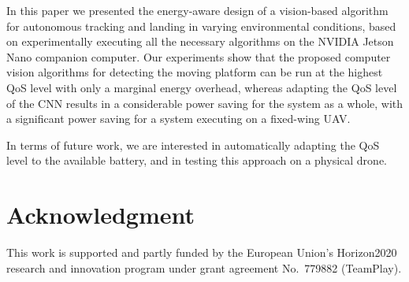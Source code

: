 \documentclass[conference]{IEEEtran}
\begin{document}
In this paper we presented %
the energy-aware design of a vision-based
algorithm for autonomous tracking and landing in varying environmental
conditions, based on experimentally executing all the necessary algorithms on 
the NVIDIA Jetson Nano companion computer.
%
Our experiments show that the proposed computer vision algorithms for 
detecting the moving platform can be run at the highest QoS level with only a marginal
energy overhead, whereas adapting the QoS level of the CNN %
results in a considerable power saving for the system as a whole, 
with a significant power saving for a system executing on a fixed-wing UAV. %

In terms of future work, we are interested in automatically adapting
the QoS level to the available battery, and in testing this approach
on a physical drone.

\section*{Acknowledgment}

This work is supported and partly funded by the European Union’s
Horizon2020 research and innovation program under grant agreement
No.~779882 (TeamPlay).


 
\vspace{1ex}
\end{document}
